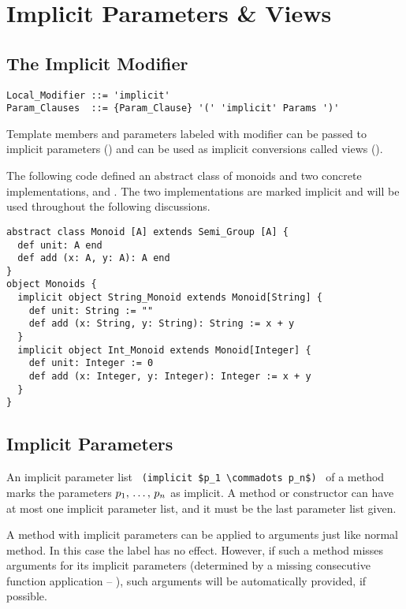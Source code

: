 
\chapter{Implicit Parameters \& Views}
\label{sec:implicit-params-views}

\section{The Implicit Modifier}

\syntax\begin{lstlisting}
Local_Modifier ::= 'implicit'
Param_Clauses  ::= {Param_Clause} '(' 'implicit' Params ')'
\end{lstlisting}

Template members and parameters labeled with  modifier can be passed to implicit parameters () and can be used as implicit conversions called views (). 

\example The following code defined an abstract class of monoids and two concrete implementations,  and . The two implementations are marked implicit and will be used throughout the following discussions. 
\begin{lstlisting}
abstract class Monoid [A] extends Semi_Group [A] {
  def unit: A end
  def add (x: A, y: A): A end
}
object Monoids {
  implicit object String_Monoid extends Monoid[String] {
    def unit: String := ""
    def add (x: String, y: String): String := x + y
  }
  implicit object Int_Monoid extends Monoid[Integer] {
    def unit: Integer := 0
    def add (x: Integer, y: Integer): Integer := x + y
  }
}
\end{lstlisting}






\section{Implicit Parameters}
\label{sec:implicit-parameters}

An implicit parameter list ~\lstinline!(implicit $p_1 \commadots p_n$)!~ of a method marks the parameters $p_1 ,\, \ldots ,\, p_n$ as implicit. A method or constructor can have at most one implicit parameter list, and it must be the last parameter list given. 

A method with implicit parameters can be applied to arguments just like normal method. In this case the  label has no effect. However, if such a method misses arguments for its implicit parameters (determined by a missing consecutive function application -- ), such arguments will be automatically provided, if possible. 






